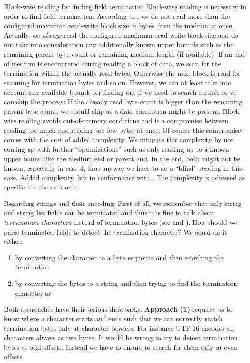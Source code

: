 {%
Block-wise reading for finding field termination
}
{%
Block-wise reading is necessary in order to find field termination. According to , we do not read more than the configured maximum read-write block size in bytes from the medium at once. Actually, we \emph{always} read the configured maximum read-write block size and do not take into consideration any additionally known upper bounds such as the remaining parent byte count or remaining medium length (if available). If an end of medium is encountered during reading a block of data, we scan for the termination within the actually read bytes. Otherwise the next block is read for scanning for termination bytes and so on. However, we can at least take into account any available bounds for finding out if we need to search further or we can skip the process: If the already read byte count is bigger than the remaining parent byte count, we should skip as a data corruption might be present.
}
{%
Block-wise reading avoids out-of-memory conditions and is a compromise between reading too much and reading too few bytes at once. Of course this compromise comes with the cost of added complexity. We mitigate this complexity by not coming up with further ``optimizations'' such as only reading up to a known upper bound like the medium end or parent end. In the end, both might not be known, especially in case 4, thus anyway we have to do a ``blind'' reading in this case.
}
{%
Added complexity, but in conformance with . The complexity is adressed as specified in the rationale.
}

Regarding strings and their encoding: First of all, we remember that only string and string list fields can be terminated and thus it is fine to talk about \emph{termination characters} instead of termination bytes (see  and ). How should we parse terminated fields to detect the termination character? We could do it either:
\begin{enumerate}
\item by converting the character to a byte sequence and then searching the termination
\item by converting the bytes to a string and then trying to find the termination character or
\end{enumerate}

Both approaches have their serious drawbacks. \textbf{Approach (1)} requires us to know where a character starts and ends such that we can correctly match termination bytes only at character borders. For instance UTF-16 encodes all characters always as two bytes. It would be wrong to try to detect termination bytes at odd offsets. Instead we have to ensure to search for them only at even offsets.

